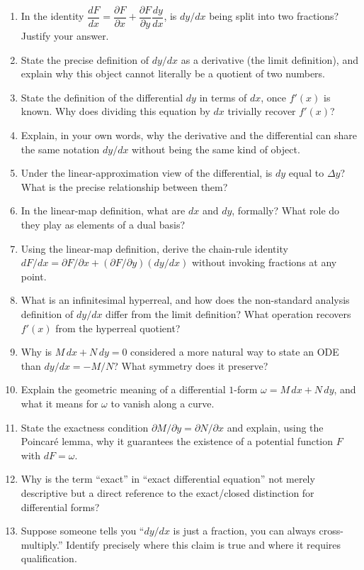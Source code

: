 \documentclass{essay}
\begin{document}
\begin{enumerate}[leftmargin=*, itemsep=4pt]
  \item In the identity \(\dfrac{dF}{dx} = \dfrac{\partial F}{\partial x} + \dfrac{\partial F}{\partial y}\dfrac{dy}{dx}\), is \(dy/dx\) being split into two fractions? Justify your answer.
  \item State the precise definition of \(dy/dx\) as a derivative (the limit definition), and explain why this object cannot literally be a quotient of two numbers.
  \item State the definition of the differential \(dy\) in terms of \(dx\), once \(f'(x)\) is known. Why does dividing this equation by \(dx\) trivially recover \(f'(x)\)?
  \item Explain, in your own words, why the derivative and the differential can share the same notation \(dy/dx\) without being the same kind of object.
  \item Under the linear-approximation view of the differential, is \(dy\) equal to \(\Delta y\)? What is the precise relationship between them?
  \item In the linear-map definition, what are \(dx\) and \(dy\), formally? What role do they play as elements of a dual basis?
  \item Using the linear-map definition, derive the chain-rule identity \(dF/dx = \partial F/\partial x + (\partial F/\partial y)(dy/dx)\) without invoking fractions at any point.
  \item What is an infinitesimal hyperreal, and how does the non-standard analysis definition of \(dy/dx\) differ from the limit definition? What operation recovers \(f'(x)\) from the hyperreal quotient?
  \item Why is \(M\,dx + N\,dy = 0\) considered a more natural way to state an ODE than \(dy/dx = -M/N\)? What symmetry does it preserve?
  \item Explain the geometric meaning of a differential \(1\)-form \(\omega = M\,dx + N\,dy\), and what it means for \(\omega\) to vanish along a curve.
  \item State the exactness condition \(\partial M/\partial y = \partial N/\partial x\) and explain, using the Poincar\'e lemma, why it guarantees the existence of a potential function \(F\) with \(dF = \omega\).
  \item Why is the term ``exact'' in ``exact differential equation'' not merely descriptive but a direct reference to the exact/closed distinction for differential forms?
  \item Suppose someone tells you ``\(dy/dx\) is just a fraction, you can always cross-multiply.'' Identify precisely where this claim is true and where it requires qualification.

\end{enumerate}
\end{document}
